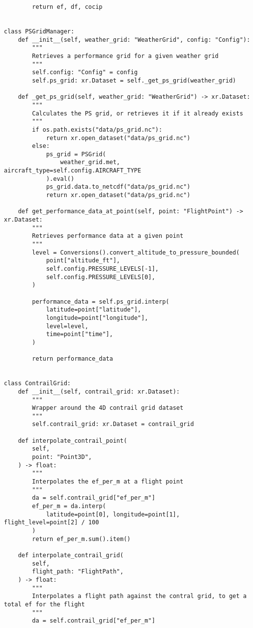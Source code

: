 \begin{verbatim}
        return ef, df, cocip


class PSGridManager:
    def __init__(self, weather_grid: "WeatherGrid", config: "Config"):
        """
        Retrieves a performance grid for a given weather grid
        """
        self.config: "Config" = config
        self.ps_grid: xr.Dataset = self._get_ps_grid(weather_grid)

    def _get_ps_grid(self, weather_grid: "WeatherGrid") -> xr.Dataset:
        """
        Calculates the PS grid, or retrieves it if it already exists
        """
        if os.path.exists("data/ps_grid.nc"):
            return xr.open_dataset("data/ps_grid.nc")
        else:
            ps_grid = PSGrid(
                weather_grid.met, aircraft_type=self.config.AIRCRAFT_TYPE
            ).eval()
            ps_grid.data.to_netcdf("data/ps_grid.nc")
            return xr.open_dataset("data/ps_grid.nc")

    def get_performance_data_at_point(self, point: "FlightPoint") -> xr.Dataset:
        """
        Retrieves performance data at a given point
        """
        level = Conversions().convert_altitude_to_pressure_bounded(
            point["altitude_ft"],
            self.config.PRESSURE_LEVELS[-1],
            self.config.PRESSURE_LEVELS[0],
        )

        performance_data = self.ps_grid.interp(
            latitude=point["latitude"],
            longitude=point["longitude"],
            level=level,
            time=point["time"],
        )

        return performance_data


class ContrailGrid:
    def __init__(self, contrail_grid: xr.Dataset):
        """
        Wrapper around the 4D contrail grid dataset
        """
        self.contrail_grid: xr.Dataset = contrail_grid

    def interpolate_contrail_point(
        self,
        point: "Point3D",
    ) -> float:
        """
        Interpolates the ef_per_m at a flight point
        """
        da = self.contrail_grid["ef_per_m"]
        ef_per_m = da.interp(
            latitude=point[0], longitude=point[1], flight_level=point[2] / 100
        )
        return ef_per_m.sum().item()

    def interpolate_contrail_grid(
        self,
        flight_path: "FlightPath",
    ) -> float:
        """
        Interpolates a flight path against the contral grid, to get a total ef for the flight
        """
        da = self.contrail_grid["ef_per_m"]


\end{verbatim}
